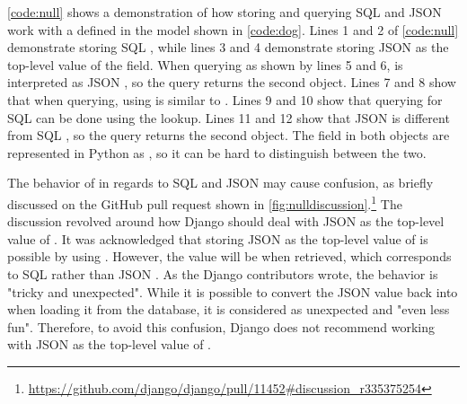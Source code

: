 \noindent
\begin{minipage}{\linewidth}

\end{minipage}

\autoref{code:null} shows a demonstration of how storing and querying SQL
 and JSON  work with a  defined in the
 model shown in \autoref{code:dog}. Lines 1 and 2 of
\autoref{code:null} demonstrate storing SQL , while lines 3 and 4
demonstrate storing JSON  as the top-level value of the field. When
querying as shown by lines 5 and 6,  is interpreted as JSON
, so the query returns the second object. Lines 7 and 8 show that
when querying, using  is similar to . Lines
9 and 10 show that querying for SQL  can be done using the
 lookup. Lines 11 and 12 show that JSON  is different
from SQL , so the query returns the second object. The 
field in both objects are represented in Python as , so it can be
hard to distinguish between the two.

The behavior of  in regards to SQL  and JSON
 may cause confusion, as briefly discussed on the GitHub pull
request shown in
\autoref{fig:nulldiscussion}.\footnote{\url{
	https://github.com/django/django/pull/11452\#discussion\_r335375254}}
The discussion revolved around how Django should deal with JSON  as
the top-level value of . It was acknowledged that storing JSON
 as the top-level value of  is possible by using
. However, the value will be  when retrieved, which
corresponds to SQL  rather than JSON . As the Django
contributors wrote, the behavior is "tricky and unexpected". While it is
possible to convert the JSON  value back into 
when loading it from the database, it is considered as unexpected and "even
less fun". Therefore, to avoid this confusion, Django does not recommend
working with JSON  as the top-level value of .

